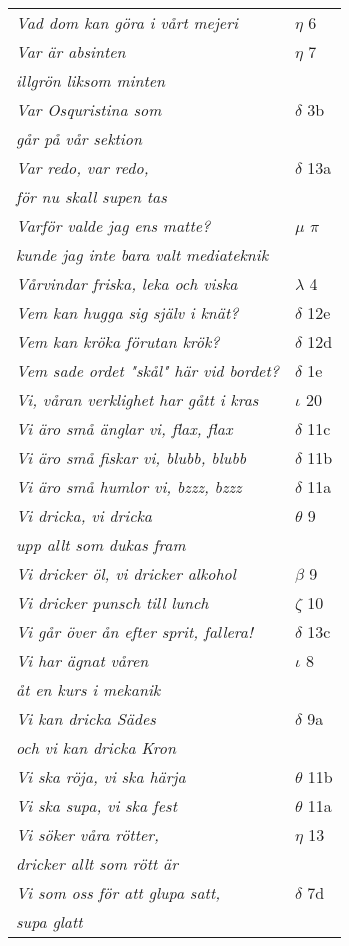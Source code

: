 \documentclass[a6paper,10pt]{article}
\begin{document}
\newpage
\begin{table}[!h]
\begin{tabular}{l l}
\textit{Vad dom kan göra i vårt mejeri}	&$\eta$ 6\\
\textit{Var är absinten}	&$\eta$ 7\\
\textit{illgrön liksom minten} &\\
\textit{Var Osquristina som}	&$\delta$ 3b\\
\textit{går på vår sektion} &\\
\textit{Var redo, var redo,}	&$\delta$ 13a\\
\textit{för nu skall supen tas} &\\
\textit{Varför valde jag ens matte?} &$\mu$ $\pi$\\
\textit{kunde jag inte bara valt mediateknik} &\\
\textit{Vårvindar friska, leka och viska}	&$\lambda$ 4\\
\textit{Vem kan hugga sig själv i knät?}	&$\delta$ 12e\\
\textit{Vem kan kröka förutan krök?}	&$\delta$ 12d\\
\textit{Vem sade ordet "skål" här vid bordet?}	&$\delta$ 1e\\
\textit{Vi, våran verklighet har gått i kras}&$\iota$ 20\\
\textit{Vi äro små änglar vi, flax, flax}	&$\delta$ 11c\\
\textit{Vi äro små fiskar vi, blubb, blubb}	&$\delta$ 11b\\
\textit{Vi äro små humlor vi, bzzz, bzzz}	&$\delta$ 11a\\
\textit{Vi dricka, vi dricka}	&$\theta$ 9\\
\textit{upp allt som dukas fram} &\\
\textit{Vi dricker öl, vi dricker alkohol}	&$\beta$ 9\\
\textit{Vi dricker punsch till lunch}	&$\zeta$ 10\\
\textit{Vi går över ån efter sprit, fallera!}	&$\delta$ 13c\\
\textit{Vi har ägnat våren}	&$\iota$ 8\\
\textit{åt en kurs i mekanik} &\\
\textit{Vi kan dricka Sädes}	&$\delta$ 9a\\
\textit{och vi kan dricka Kron} &\\
\textit{Vi ska röja, vi ska härja}	&$\theta$ 11b\\
\textit{Vi ska supa, vi ska fest}	&$\theta$ 11a\\
\textit{Vi söker våra rötter,}	&$\eta$ 13\\
\textit{dricker allt som rött är} &\\
\textit{Vi som oss för att glupa satt,}	&$\delta$ 7d\\
\textit{supa glatt} &\\
\end{tabular}
\end{table}
\end{document}
